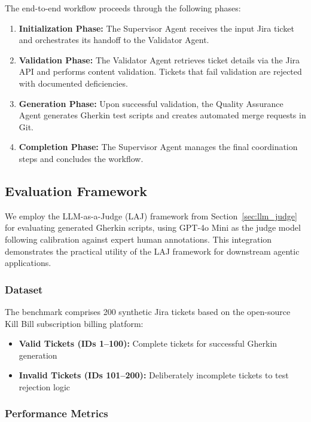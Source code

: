 The end-to-end workflow proceeds through the following phases:

\begin{enumerate}[leftmargin=*]
    \item \textbf{Initialization Phase:} The Supervisor Agent receives the input Jira ticket and orchestrates its handoff to the Validator Agent.
    \item \textbf{Validation Phase:} The Validator Agent retrieves ticket details via the Jira API and performs content validation. Tickets that fail validation are rejected with documented deficiencies.
    \item \textbf{Generation Phase:} Upon successful validation, the Quality Assurance Agent generates Gherkin test scripts and creates automated merge requests in Git.
    \item \textbf{Completion Phase:} The Supervisor Agent manages the final coordination steps and concludes the workflow.
\end{enumerate}

\subsection{Evaluation Framework}

We employ the LLM-as-a-Judge (LAJ) framework from Section~\ref{sec:llm_judge} for evaluating generated Gherkin scripts, using GPT-4o Mini as the judge model following calibration against expert human annotations. This integration demonstrates the practical utility of the LAJ framework for downstream agentic applications.

\subsubsection{Dataset}

The benchmark comprises 200 synthetic Jira tickets based on the open-source Kill Bill subscription billing platform:
\begin{itemize}[leftmargin=*]
    \item \textbf{Valid Tickets (IDs 1--100):} Complete tickets for successful Gherkin generation
    \item \textbf{Invalid Tickets (IDs 101--200):} Deliberately incomplete tickets to test rejection logic
\end{itemize}

\subsubsection{Performance Metrics}

